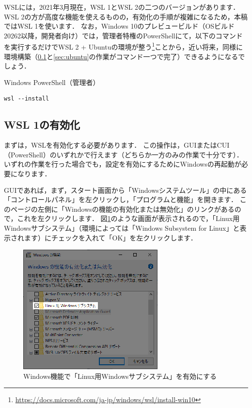 \documentclass[dvipdfmx]{jarticle}
\begin{document}
WSLには，2021年3月現在，WSL 1とWSL 2の二つのバージョンがあります．
WSL 2の方が高度な機能を使えるものの，有効化の手順が複雑になるため，本稿ではWSL 1を使います．
なお，Windows 10のプレビュービルド（OSビルド20262以降，開発者向け）では，管理者特権のPowerShellにて，以下のコマンドを実行するだけでWSL 2 + Ubuntuの環境が整う\footnote{\url{https://docs.microsoft.com/ja-jp/windows/wsl/install-win10}}ことから，近い将来，同様に環境構築（\ref{sec:windows}と\ref{sec:ubuntu}の作業がコマンド一つで完了）できるようになるでしょう．
\begin{itembox}[l]{Windows PowerShell（管理者）}
\begin{verbatim}
wsl --install
\end{verbatim}
\end{itembox}

\subsection{WSL 1の有効化}\label{sec:windows}

まずは，WSLを有効化する必要があります．
この操作は，GUIまたはCUI（PowerShell）のいずれかで行えます（どちらか一方のみの作業で十分です）．
いずれの作業を行った場合でも，設定を有効にするためにWindowsの再起動が必要になります．

GUIであれば，まず，スタート画面から「Windowsシステムツール」の中にある「コントロールパネル」を左クリックし，「プログラムと機能」を開きます．
このページの左側に「Windowsの機能の有効化または無効化」のリンクがあるので，これを左クリックします．
図\ref{fig:wsl}のような画面が表示されるので，「Linux用Windowsサブシステム」（環境によっては「Windows Subsystem for Linux」と表示されます）にチェックを入れて「OK」を左クリックします．

\begin{figure}[h]
  \centering
  \includegraphics[width=0.6\linewidth]{figures/WSL.eps}
  \caption{Windows機能で「Linux用Windowsサブシステム」を有効にする}
  \label{fig:wsl}
\end{figure}
\end{document}

